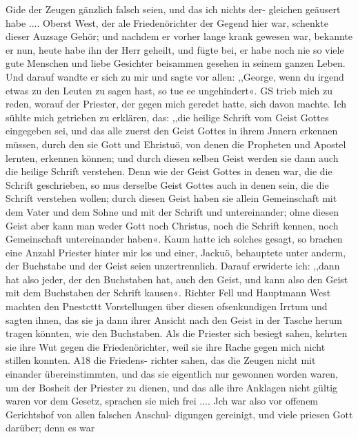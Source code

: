 Gide der Zeugen gänzlich falsch seien, und das ich nichts der-
gleichen geäusert habe .... Oberst West, der ale Friedenörichter
der Gegend hier war, schenkte dieser Auzsage Gehör; und
nachdem er vorher lange krank gewesen war, bekannte er nun,
heute habe ihn der Herr geheilt, und fügte bei, er habe noch nie
so viele gute Menschen und liebe Gesichter beisammen gesehen in
seinem ganzen Leben. Und darauf wandte er sich zu mir und
sagte vor allen: ,,George, wenn du irgend etwas zu den Leuten
zu sagen hast, so tue ee ungehindert«. GS trieb mich zu reden,
worauf der Priester, der gegen mich geredet hatte, sich davon
machte. Ich sühlte mich getrieben zu erklären, das: ,,die heilige
Schrift vom Geist Gottes eingegeben sei, und das alle zuerst
den Geist Gottes in ihrem Jnnern erkennen müssen, durch den
sie Gott und Ehristuö, von denen die Propheten und Apostel
lernten, erkennen können; und durch diesen selben Geist werden
sie dann auch die heilige Schrift verstehen. Denn wie der Geist
Gottes in denen war, die die Schrift geschrieben, so mus derselbe
Geist Gottes auch in denen sein, die die Schrift verstehen wollen;
durch diesen Geist haben sie allein Gemeinschaft mit dem Vater
und dem Sohne und mit der Schrift und untereinander; ohne
diesen Geist aber kann man weder Gott noch Christus, noch die
Schrift kennen, noch Gemeinschaft untereinander haben«. Kaum
hatte ich solches gesagt, so brachen eine Anzahl Priester hinter
mir los und einer, Jackuö, behauptete unter anderm, der
Buchstabe und der Geist seien unzertrennlich. Darauf erwiderte
ich: ,,dann hat also jeder, der den Buchstaben hat, auch den
Geist, und kann also den Geist mit dem Buchstaben der Schrift
kausen«. Richter Fell und Hauptmann West machten den Pnestcttt
Vorstellungen über diesen ofsenkundigen Irrtum und sagten ihnen,
das sie ja dann ihrer Ansicht nach den Geist in der Tasche herum
tragen könnten, wie den Buchstaben. Als die Priester sich besiegt
sahen, kehrten sie ihre Wut gegen die Friedenörichter, weil sie
ihre Rache gegen mich nicht stillen konnten. A18 die Friedens-
richter sahen, das die Zeugen nicht mit einander übereinstimmten,
und das sie eigentlich nur gewonnen worden waren, um der
Bosheit der Priester zu dienen, und das alle ihre Anklagen nicht
gültig waren vor dem Gesetz, sprachen sie mich frei .... Jch
war also vor offenem Gerichtshof von allen falschen Anschul-
digungen gereinigt, und viele priesen Gott darüber; denn es war


